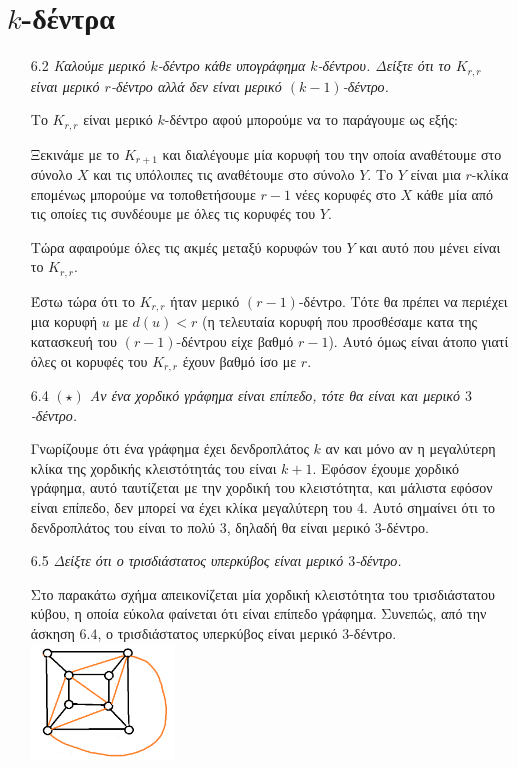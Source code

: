 \documentclass[a4paper, oneside, 11pt]{article}
\theoremstyle{definition}
\begin{document}
\section{$k$-δέντρα}

\begin{enumerate}
   \item[6.2] \emph{Καλούμε μερικό $k$-δέντρο κάθε υπογράφημα $k$-δέντρου.
   Δείξτε ότι το $K_{r,r}$ είναι μερικό $r$-δέντρο αλλά δεν είναι μερικό
   $(k-1)$-δέντρο.}

   Το $K_{r,r}$ είναι μερικό $k$-δέντρο αφού μπορούμε να το παράγουμε
   ως εξής:

   Ξεκινάμε με το $K_{r+1}$ και διαλέγουμε μία κορυφή του την οποία
   αναθέτουμε στο σύνολο $X$ και τις υπόλοιπες τις αναθέτουμε στο σύνολο
   $Y$. Το $Y$ είναι μια $r$-κλίκα επομένως μπορούμε να τοποθετήσουμε
   $r-1$ νέες κορυφές στο $X$ κάθε μία από τις οποίες τις συνδέουμε
   με όλες τις κορυφές του $Y$.

   Τώρα αφαιρούμε όλες τις ακμές μεταξύ κορυφών του $Y$ και αυτό
   που μένει είναι το $K_{r,r}$.

   Έστω τώρα ότι το $K_{r,r}$ ήταν μερικό $(r-1)$-δέντρο. Τότε θα πρέπει
   να περιέχει μια κορυφή $u$ με $d(u) < r$ (η τελευταία κορυφή που προσθέσαμε
   κατα της κατασκευή του $(r-1)$-δέντρου είχε βαθμό $r-1$). Αυτό όμως είναι
   άτοπο γιατί όλες οι κορυφές του $K_{r,r}$ έχουν βαθμό ίσο με $r$.


	\item[6.4] \emph{$(\star)$ Αν ένα χορδικό γράφημα είναι επίπεδο, τότε θα είναι και μερικό $3$-δέντρο.}

Γνωρίζουμε ότι ένα γράφημα έχει δενδροπλάτος $k$ αν και μόνο αν η μεγαλύτερη κλίκα της χορδικής κλειστότητάς του είναι $k+1$. Εφόσον έχουμε χορδικό γράφημα, αυτό ταυτίζεται με την χορδική του κλειστότητα,
και μάλιστα εφόσον είναι επίπεδο, δεν μπορεί να έχει κλίκα μεγαλύτερη του $4$. Αυτό σημαίνει ότι το δενδροπλάτος του είναι το πολύ $3$, δηλαδή θα είναι μερικό $3$-δέντρο.

	\item[6.5] \emph{Δείξτε ότι ο τρισδιάστατος υπερκύβος είναι μερικό $3$-δέντρο.}

Στο παρακάτω σχήμα απεικονίζεται μία χορδική κλειστότητα του τρισδιάστατου κύβου, η οποία εύκολα φαίνεται ότι είναι επίπεδο γράφημα. Συνεπώς, από την άσκηση $6.4$, ο τρισδιάστατος υπερκύβος είναι μερικό 
$3$-δέντρο.
\newline
\includegraphics[width=0.3\textwidth]{./pics/graph1.png}


\end{enumerate}
\end{document}
